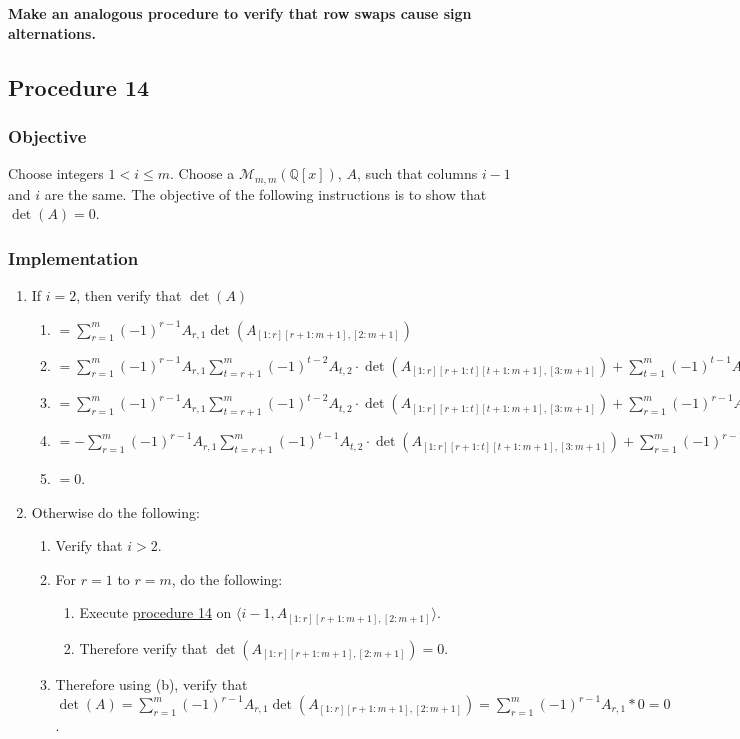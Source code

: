 \documentclass[twocolumn]{article}
\newcommand{\procedure}[2][]{\subsection*{Procedure #2 \ifthenelse{\equal{#1}{}}{}{(#1)}}\label{sec:procedure #2}}
\newcommand{\objective}{\subsubsection*{Objective}}
\newcommand{\implementation}{\subsubsection*{Implementation}}
\begin{document}
			\textbf{Make an analogous procedure to verify that row swaps cause sign alternations.}
		\procedure{14}
			\objective
				Choose integers $1<i\le m$. Choose a $\mathcal{M}_{m,m}(\mathbb{Q}[x])$, $A$, such that columns $i-1$ and $i$ are the same. The objective of the following instructions is to show that $\det(A)=0$.
			\implementation
				\begin{enumerate}
					\item If $i=2$, then verify that $\det(A)$
					\begin{enumerate}
						\item $=\sum_{r=1}^m (-1)^{r-1}A_{r,1}\det(A_{[1:r][r+1:m+1],[2:m+1]})$
						\item $=\sum_{r=1}^m (-1)^{r-1}A_{r,1}\sum_{t=r+1}^m (-1)^{t-2}A_{t,2}\cdot\det(A_{[1:r][r+1:t][t+1:m+1],[3:m+1]})+\sum_{t=1}^m (-1)^{t-1}A_{t,1}\sum_{r=1}^{t-1} (-1)^{r-1}A_{r,2}\cdot\det(A_{[1:r][r+1:t][t+1:m+1],[3:m+1]})$
						\item $=\sum_{r=1}^m (-1)^{r-1}A_{r,1}\sum_{t=r+1}^m (-1)^{t-2}A_{t,2}\cdot\det(A_{[1:r][r+1:t][t+1:m+1],[3:m+1]})+\sum_{r=1}^m (-1)^{r-1}A_{r,2}\sum_{t=r+1}^m (-1)^{t-1}A_{t,1}\cdot\det(A_{[1:r][r+1:t][t+1:m+1],[3:m+1]})$
						\item $=-\sum_{r=1}^m (-1)^{r-1}A_{r,1}\sum_{t=r+1}^m (-1)^{t-1}A_{t,2}\cdot\det(A_{[1:r][r+1:t][t+1:m+1],[3:m+1]})+\sum_{r=1}^m (-1)^{r-1}A_{r,1}\sum_{t=r+1}^m (-1)^{t-1}A_{t,2}\cdot\det(A_{[1:r][r+1:t][t+1:m+1],[3:m+1]})$
						\item $=0$.
					\end{enumerate}
					\item Otherwise do the following:
					\begin{enumerate}
						\item Verify that $i>2$.
						\item For $r=1$ to $r=m$, do the following:
						\begin{enumerate}
							\item Execute \hyperref[sec:procedure 14]{procedure 14} on $\langle i-1,\allowbreak A_{[1:r][r+1:m+1],[2:m+1]}\rangle$.
							\item Therefore verify that $\det(A_{[1:r][r+1:m+1],[2:m+1]})=0$.
						\end{enumerate}
						\item Therefore using (b), verify that $\det(A)=\sum_{r=1}^m (-1)^{r-1}A_{r,1}\det(A_{[1:r][r+1:m+1],[2:m+1]})=\sum_{r=1}^m (-1)^{r-1}A_{r,1}*0=0$.
					\end{enumerate}
				\end{enumerate}
\end{document}
